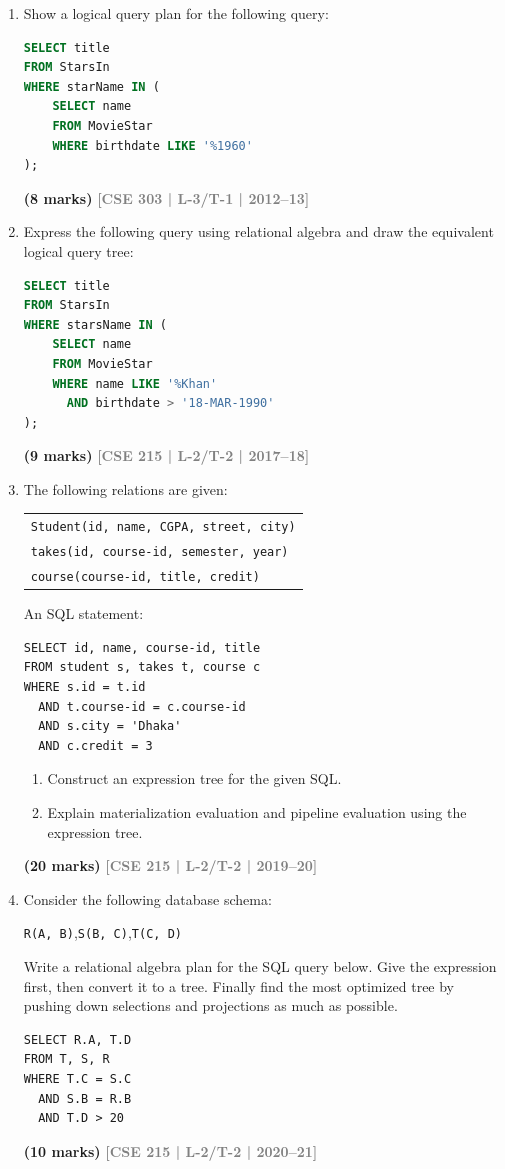 \documentclass[12pt,a3paper]{article}
\newcommand{\yr}[1]{\hfill\textcolor{gray}{\small\textbf{[#1]}}}
\newcommand{\mk}[1]{\textcolor{orange!70!black}{\small\textbf{(#1 marks)}}}
\begin{document}
\begin{enumerate}

\item Show a logical query plan for the following query:
\begin{lstlisting}[language=SQL]
SELECT title
FROM StarsIn
WHERE starName IN (
    SELECT name
    FROM MovieStar
    WHERE birthdate LIKE '%1960'
);
\end{lstlisting}
\mk{8} \yr{CSE 303 | L-3/T-1 | 2012--13}

\item Express the following query using relational algebra and draw the equivalent logical query tree:
\begin{lstlisting}[language=SQL]
SELECT title
FROM StarsIn
WHERE starsName IN (
    SELECT name
    FROM MovieStar
    WHERE name LIKE '%Khan'
      AND birthdate > '18-MAR-1990'
);
\end{lstlisting}
  \mk{9} \yr{CSE 215 | L-2/T-2 | 2017--18}

\item The following relations are given:
\begin{center}
\begin{tabular}{l}
\texttt{Student(id, name, CGPA, street, city)}\\
\texttt{takes(id, course-id, semester, year)}\\
\texttt{course(course-id, title, credit)}
\end{tabular}
\end{center}
An SQL statement:
\begin{lstlisting}
SELECT id, name, course-id, title
FROM student s, takes t, course c
WHERE s.id = t.id
  AND t.course-id = c.course-id
  AND s.city = 'Dhaka'
  AND c.credit = 3
\end{lstlisting}
\begin{enumerate}
  \item Construct an expression tree for the given SQL.
  \item Explain materialization evaluation and pipeline evaluation using the expression tree.
\end{enumerate}
 \mk{20} \yr{CSE 215 | L-2/T-2 | 2019--20}

\item Consider the following database schema:
\begin{center}
\texttt{R(A, B)},\quad \texttt{S(B, C)},\quad \texttt{T(C, D)}
\end{center}
Write a relational algebra plan for the SQL query below. Give the expression first, then convert it to a tree. Finally find the most optimized tree by pushing down selections and projections as much as possible.
\begin{lstlisting}
SELECT R.A, T.D
FROM T, S, R
WHERE T.C = S.C
  AND S.B = R.B
  AND T.D > 20
\end{lstlisting}
 \mk{10} \yr{CSE 215 | L-2/T-2 | 2020--21}


\end{enumerate}
\end{document}
